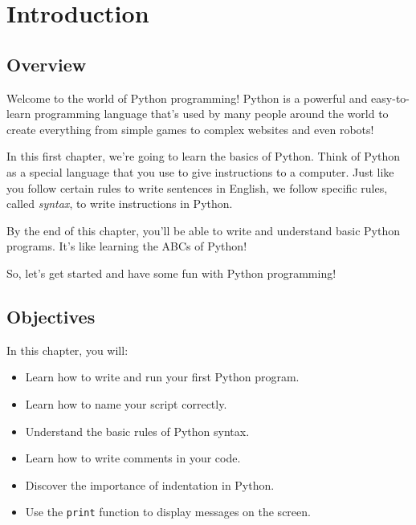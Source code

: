 \section{Introduction}

\subsection*{Overview}
Welcome to the world of Python programming! Python is a powerful and easy-to-learn programming language that's used by many people around the world to create everything from simple games to complex websites and even robots!

In this first chapter, we're going to learn the basics of Python. Think of Python as a special language that you use to give instructions to a computer. Just like you follow certain rules to write sentences in English, we follow specific rules, called \textit{syntax}, to write instructions in Python.

By the end of this chapter, you'll be able to write and understand basic Python programs. It's like learning the ABCs of Python!

So, let's get started and have some fun with Python programming!

\subsection*{Objectives}
In this chapter, you will:
\begin{itemize}
    \item Learn how to write and run your first Python program.
    \item Learn how to name your script correctly.
    \item Understand the basic rules of Python syntax.
    \item Learn how to write comments in your code.
    \item Discover the importance of indentation in Python.
    \item Use the \texttt{print} function to display messages on the screen.
\end{itemize}